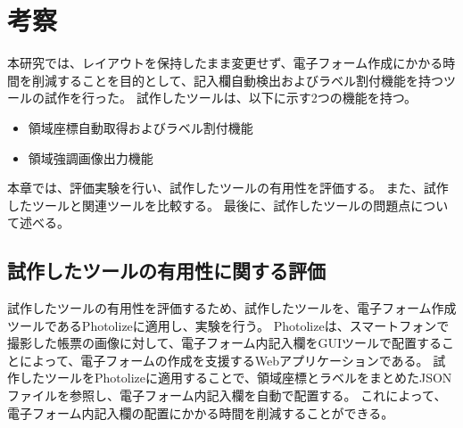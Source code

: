 \chapter{考察}\label{cha:Discussion}
本研究では、レイアウトを保持したまま変更せず、電子フォーム作成にかかる時間を削減することを目的として、記入欄自動検出およびラベル割付機能を持つツールの試作を行った。
試作したツールは、以下に示す2つの機能を持つ。

\begin{itemize}
  \item 領域座標自動取得およびラベル割付機能
  \item 領域強調画像出力機能
\end{itemize}

本章では、評価実験を行い、試作したツールの有用性を評価する。
また、試作したツールと関連ツールを比較する。
最後に、試作したツールの問題点について述べる。

\section{試作したツールの有用性に関する評価}\label{sec:evalue_usefulness}
試作したツールの有用性を評価するため、試作したツールを、電子フォーム作成ツールであるPhotolize\cite{Photolize}に適用し、実験を行う。
Photolizeは、スマートフォンで撮影した帳票の画像に対して、電子フォーム内記入欄をGUIツールで配置することによって、電子フォームの作成を支援するWebアプリケーションである。
試作したツールをPhotolizeに適用することで、領域座標とラベルをまとめたJSONファイルを参照し、電子フォーム内記入欄を自動で配置する。
これによって、電子フォーム内記入欄の配置にかかる時間を削減することができる。

